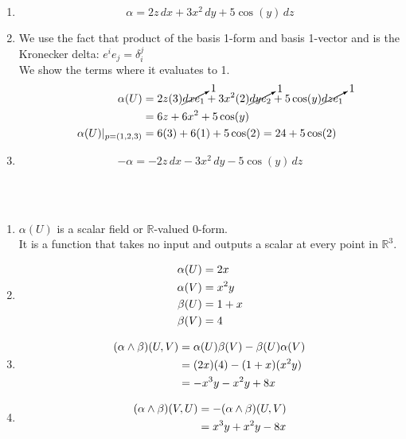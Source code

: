 \documentclass{article}
\begin{document}
\begin{enumerate}[label=(\alph*)]
    \item $$\alpha = 2z\, dx + 3x^2\, dy + 5\cos(y)\, dz$$

    \item
    We use the fact that product of the basis 1-form and basis 1-vector and is the Kronecker delta: $ e^i e_j = \delta_i^j$\\
    We show the terms where it evaluates to 1.\\
    \begin{align}
        \alpha(U)   &= 2z(3)\cancelto{1}{dx e_1} + 3x^2(2)\cancelto{1}{dy e_2} + 5\cos(y)\cancelto{1}{dz e_1} \notag\\
                    &= 6z + 6x^2 + 5\cos(y) \notag\\
        \alpha(U)|_{p=(1, 2, 3)} &= 6(3) + 6(1) + 5\cos(2) = 24 + 5\cos(2) \notag
    \end{align}

    \item $$-\alpha = -2z\, dx - 3x^2\, dy - 5\cos(y)\, dz$$
\end{enumerate}


\vspace{1.8cm}
\\\\

\begin{enumerate}[label=(\alph*)]
    \item $\alpha(U)$ is a scalar field or $\mathbb{R}$-valued 0-form.\\
    It is a function that takes no input and outputs a scalar at every point in $\mathbb{R}^3$.
    
    \item 
    \begin{align}
        \alpha(U)   &= 2x\notag\\
        \alpha(V)   &= x^2y\notag\\
        \beta(U)   &= 1+x\notag\\
        \beta(V)   &= 4\notag
    \end{align}

    \item
    \begin{align}
        (\alpha \wedge \beta)(U, V) &= \alpha(U)\beta(V) - \beta(U)\alpha(V) \notag\\
            &= (2x)(4) - (1+x)(x^2y) \notag\\
            &= -x^3y - x^2y + 8x \notag
    \end{align}

    \item
    \begin{align}
        (\alpha \wedge \beta)(V, U) &= -(\alpha \wedge \beta)(U, V) \notag\\
            &= x^3y + x^2y - 8x \notag
    \end{align}
\end{enumerate}
\end{document}

